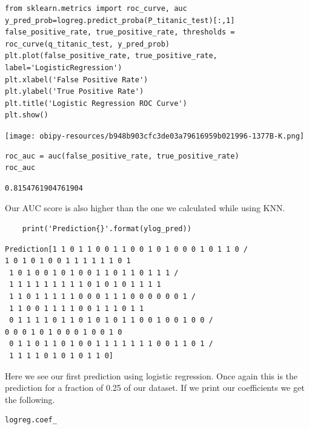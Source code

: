 \documentclass[11pt]{article}
\begin{document}
\begin{verbatim}
from sklearn.metrics import roc_curve, auc
y_pred_prob=logreg.predict_proba(P_titanic_test)[:,1]
false_positive_rate, true_positive_rate, thresholds = roc_curve(q_titanic_test, y_pred_prob)
plt.plot(false_positive_rate, true_positive_rate, label='LogisticRegression')
plt.xlabel('False Positive Rate')
plt.ylabel('True Positive Rate')
plt.title('Logistic Regression ROC Curve')
plt.show()

\end{verbatim}

\begin{center}
\texttt{[image: obipy-resources/b948b903cfc3de03a79616959b021996-1377B-K.png]}
\end{center}

\begin{verbatim}
roc_auc = auc(false_positive_rate, true_positive_rate)
roc_auc
\end{verbatim}

\begin{verbatim}
0.8154761904761904
\end{verbatim}
Our AUC score is also higher than the one we calculated while using KNN. 



\begin{verbatim}
    print('Prediction{}'.format(ylog_pred))
\end{verbatim}

\begin{verbatim}
Prediction[1 1 0 1 1 0 0 1 1 0 0 1 0 1 0 0 0 1 0 1 1 0 /
1 0 1 0 1 0 0 1 1 1 1 1 1 0 1
 1 0 1 0 0 1 0 1 0 0 1 1 0 1 1 0 1 1 1 /
 1 1 1 1 1 1 1 1 1 0 1 0 1 0 1 1 1 1
 1 1 0 1 1 1 1 1 0 0 0 1 1 1 0 0 0 0 0 0 1 /
 1 1 0 0 1 1 1 1 0 0 1 1 1 0 1 1
 0 1 1 1 1 0 1 1 0 1 0 1 0 1 1 0 0 1 0 0 1 0 0 /
0 0 0 1 0 1 0 0 0 1 0 0 1 0
 0 1 1 0 1 1 0 1 0 0 1 1 1 1 1 1 1 0 0 1 1 0 1 / 
 1 1 1 1 0 1 0 1 0 1 1 0]

\end{verbatim}

Here we see our first prediction using logistic regression. Once again this is the prediction for a fraction of 0.25 of our dataset. If we print our coefficients we get the following. 

\begin{verbatim}
logreg.coef_
\end{verbatim}
\end{document}
